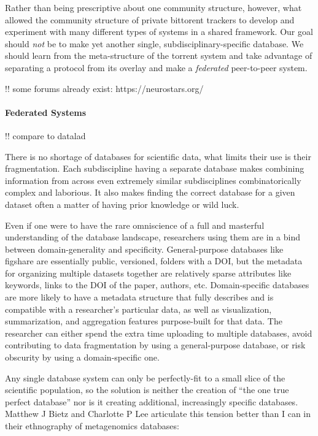 \documentclass[nohyper]{tufte-book-jls}
\begin{document}
Rather than being prescriptive about one community structure, however,
what allowed the community structure of private bittorent trackers to
develop and experiment with many different types of systems in a shared
framework. Our goal should \emph{not} be to make yet another single,
subdisciplinary-specific database. We should learn from the
meta-structure of the torrent system and take advantage of separating a
protocol from its overlay and make a \emph{federated} peer-to-peer
system.

!! some forums already exist: https://neurostars.org/

\hypertarget{federated-systems}{%
\paragraph{Federated Systems}\label{federated-systems}}

!! compare to datalad

There is no shortage of databases for scientific data, what limits their
use is their fragmentation. Each subdiscipline having a separate
database makes combining information from across even extremely similar
subdisciplines combinatorically complex and laborious. It also makes
finding the correct database for a given dataset often a matter of
having prior knowledge or wild luck.

Even if one were to have the rare omniscience of a full and masterful
understanding of the database landscape, researchers using them are in a
bind between domain-generality and specificity. General-purpose
databases like figshare are essentially public, versioned, folders with a
DOI, but the metadata for organizing multiple datasets together are
relatively sparse attributes like keywords, links to the DOI of the
paper, authors, etc. Domain-specific databases are more likely to have a
metadata structure that fully describes and is compatible with a
researcher's particular data, as well as visualization, summarization,
and aggregation features purpose-built for that data. The researcher can
either spend the extra time uploading to multiple databases, avoid
contributing to data fragmentation by using a general-purpose database,
or risk obscurity by using a domain-specific one.

Any single database system can only be perfectly-fit to a small slice of
the scientific population, so the solution is neither the creation of
``the one true perfect database'' nor is it creating additional,
increasingly specific databases. Matthew J Bietz and Charlotte P Lee
articulate this tension better than I can in their ethnography of
metagenomics databases:
\end{document}
